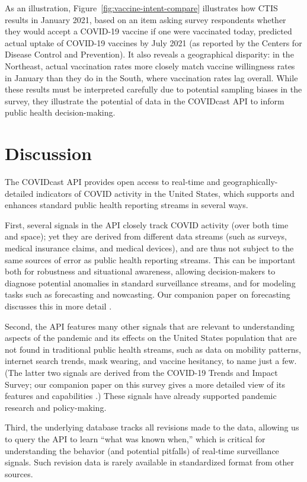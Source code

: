 \documentclass[9pt,twocolumn,twoside,lineno]{pnas-new}
\begin{document}
As an illustration, Figure~\ref{fig:vaccine-intent-compare} illustrates how CTIS
results in January 2021, based on an item asking survey respondents whether they
would accept a COVID-19 vaccine if one were vaccinated today, predicted actual
uptake of COVID-19 vaccines by July 2021 (as reported by the Centers for Disease
Control and Prevention). It also reveals a geographical disparity: in the
Northeast, actual vaccination rates more closely match vaccine willingness rates
in January than they do in the South, where vaccination rates lag overall. While 
these results must be interpreted carefully due to potential sampling biases in
the survey, they illustrate the potential of data in the COVIDcast API to inform
public health decision-making.

\section{Discussion}

The COVIDcast API provides open access to real-time and geographically-detailed
indicators of COVID activity in the United States, which supports and enhances
standard public health reporting streams in several ways.

First, several signals in the API closely track COVID activity (over both time
and space); yet they are derived from different data streams (such as surveys,
medical insurance claims, and medical devices), and are thus not subject to the
same sources of error as public health reporting streams. This can be important
both for robustness and situational awareness, allowing decision-makers to
diagnose potential anomalies in standard surveillance streams, and for modeling
tasks such as forecasting and nowcasting. Our companion paper on forecasting
discusses this in more detail \cite{McDonald:2021}.

Second, the API features many other signals that are relevant to understanding
aspects of the pandemic and its effects on the United States population that are
not found in traditional public health streams, such as data on mobility
patterns, internet search trends, mask wearing, and vaccine hesitancy, to name
just a few. (The latter two signals are derived from the COVID-19 Trends and
Impact Survey; our companion paper on this survey gives a more detailed view of
its features and capabilities \cite{Salomon:2021}.) These signals have already
supported pandemic research and policy-making.

Third, the underlying database tracks all revisions made to the data, allowing
us to query the API to learn ``what was known when,'' which is critical for
understanding the behavior (and potential pitfalls) of real-time surveillance
signals. Such revision data is rarely available in standardized format from
other sources.
\end{document}
